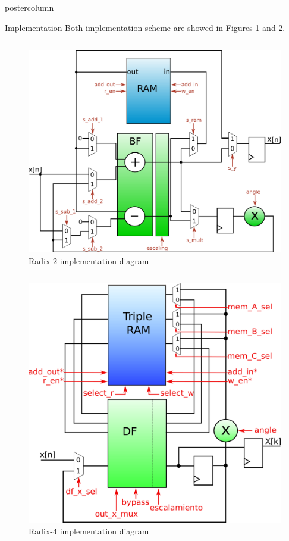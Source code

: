 \documentclass[final]{beamer}
\begin{document}
\begin{frame}{}
\begin{columns}
\begin{column}{.5\textwidth}
\begin{beamercolorbox}[center,wd=0.9\textwidth]{postercolumn}
\begin{minipage}[T]{.99\textwidth}
{\begin{block}{Implementation}
			Both implementation scheme are showed in Figures \ref{fig:datapathmem} and \ref{fig:datapathR4control}.
			
			\begin{column}{.44\textwidth}
				\begin{figure}[htb!]
				        \centering
				        \includegraphics[width=13cm]{./figures/datapathMem.png}
				        \caption{Radix-2 implementation diagram}
				        \label{fig:datapathmem}
				\end{figure}
			\end{column}
			\begin{column}{.45\textwidth}
				\begin{figure}[htb!]
				        \centering
				        \includegraphics[width=12cm]{./figures/r4control.png}
				        \caption{Radix-4 implementation diagram}
				        \label{fig:datapathR4control}
				\end{figure}
			\end{column}
	      

\end{block}}
\end{minipage}
\end{beamercolorbox}
\end{column}
\end{columns}
\end{frame}
\end{document}
